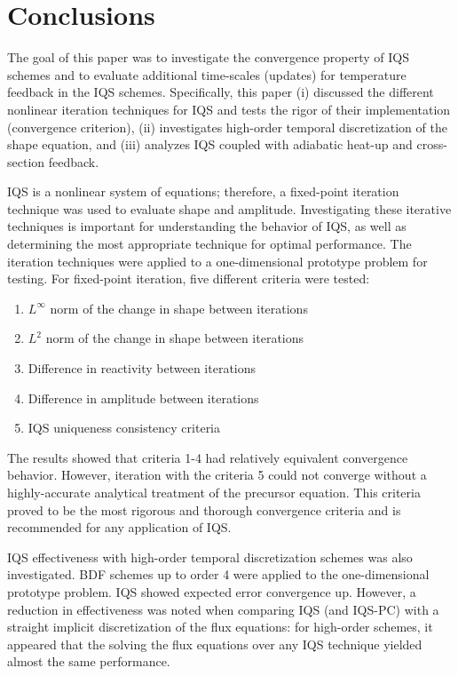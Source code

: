 \documentclass{elsarticle}
\newcommand{\iqspc}{IQS-PC\xspace}
\begin{document}
\section{Conclusions}

The goal of this paper was to investigate the convergence property of IQS schemes and to evaluate
additional time-scales (updates) for temperature feedback in the IQS schemes.  Specifically, this paper (i) discussed the different nonlinear iteration techniques for IQS and tests the rigor of their implementation (convergence criterion), (ii) investigates high-order temporal discretization of the shape equation, and (iii) analyzes IQS coupled with adiabatic heat-up and cross-section feedback.

IQS is a nonlinear system of equations; therefore, a fixed-point iteration technique was used to evaluate shape and amplitude. Investigating these iterative techniques is important for understanding the behavior of IQS, as well as determining the most appropriate technique for optimal performance. The iteration techniques were applied to a one-dimensional prototype problem for testing. For fixed-point iteration, five different criteria were tested: 
\begin{enumerate}
\item $L^\infty$ norm of the change in shape between iterations
\item $L^2$ norm of the change in shape between iterations
\item Difference in reactivity between iterations
\item Difference in amplitude between iterations
\item IQS uniqueness consistency criteria
\end{enumerate}
The results showed that criteria 1-4 had relatively equivalent convergence behavior. However, iteration with the criteria 5 could not converge without a highly-accurate analytical treatment of the precursor equation. This criteria proved to be the most rigorous and thorough convergence criteria and is recommended for any application of IQS.

IQS effectiveness with high-order temporal discretization schemes was also investigated. BDF schemes up to order 4 were applied to the one-dimensional prototype problem. IQS showed expected error convergence up. However,
a reduction in effectiveness was noted when comparing IQS (and \iqspc) with a straight implicit discretization of the flux equations: for high-order schemes, it appeared that the solving the flux equations over any IQS technique yielded 
almost the same performance.
\end{document}

